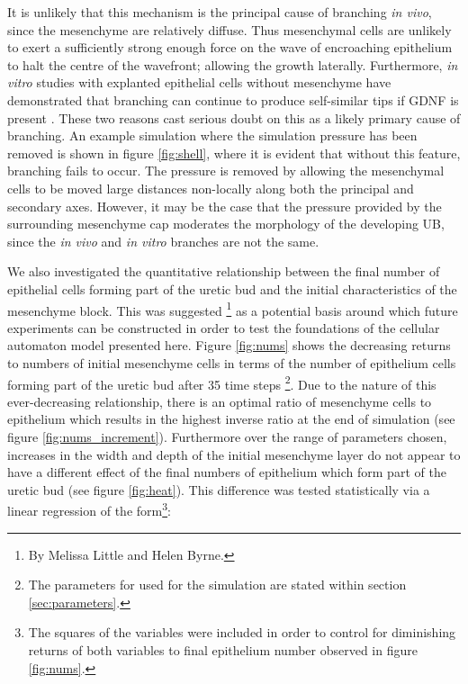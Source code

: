 \documentclass[pdftex,10pt,a4paper,twocolumn]{article}
\begin{document}
It is unlikely that this mechanism is the principal cause of branching \textit{in vivo}, since the mesenchyme are relatively diffuse. Thus mesenchymal cells are unlikely to exert a sufficiently strong enough force on the wave of encroaching epithelium to halt the centre of the wavefront; allowing the growth laterally. Furthermore, \textit{in vitro} studies with explanted epithelial cells without mesenchyme have demonstrated that branching can continue to produce self-similar tips if GDNF is present \cite{qiao1999branching}. These two reasons cast serious doubt on this as a likely primary cause of branching. An example simulation where the simulation pressure has been removed is shown in figure \ref{fig:shell}, where it is evident that without this feature, branching fails to occur. The pressure is removed by allowing the mesenchymal cells to be moved large distances non-locally along both the principal and secondary axes. However, it may be the case that the pressure provided by the surrounding mesenchyme cap moderates the morphology of the developing UB, since the \textit{in vivo} and \textit{in vitro} branches are not the same.

We also investigated the quantitative relationship between the final number of epithelial cells forming part of the uretic bud and the initial characteristics of the mesenchyme block. This was suggested \footnote{By Melissa Little and Helen Byrne.} as a potential basis around which future experiments can be constructed in order to test the foundations of the cellular automaton model presented here. Figure \ref{fig:nums} shows the decreasing returns to numbers of initial mesenchyme cells in terms of the number of epithelium cells forming part of the uretic bud after 35 time steps \footnote{The parameters for used for the simulation are stated within section \ref{sec:parameters}.}. Due to the nature of this ever-decreasing relationship, there is an optimal ratio of mesenchyme cells to epithelium which results in the highest inverse ratio at the end of simulation (see figure \ref{fig:nums_increment}). Furthermore over the range of parameters chosen, increases in the width and depth of the initial mesenchyme layer do not appear to have a different effect of the final numbers of epithelium which form part of the uretic bud (see figure \ref{fig:heat}). This difference was tested statistically via a linear regression of the form\footnote{The squares of the variables were included in order to control for diminishing returns of both variables to final epithelium number observed in figure \ref{fig:nums}.}:
\end{document}
